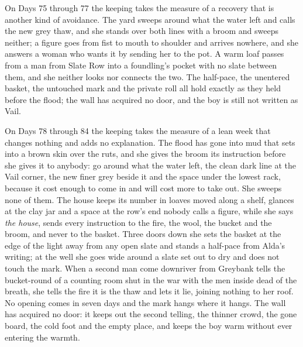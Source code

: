 \documentclass{design/chronicle}
\begin{document}
{On Days 75 through 77 the keeping takes the measure of a recovery that is another kind of avoidance. The yard sweeps around what the water left and calls the new grey thaw, and she stands over both lines with a broom and sweeps neither; a figure goes from fist to mouth to shoulder and arrives nowhere, and she answers a woman who wants it by sending her to the pot. A warm loaf passes from a man from Slate Row into a foundling’s pocket with no slate between them, and she neither looks nor connects the two. The half-pace, the unentered basket, the untouched mark and the private roll all hold exactly as they held before the flood; the wall has acquired no door, and the boy is still not written as Vail.

On Days 78 through 84 the keeping takes the measure of a lean week that changes nothing and adds no explanation. The flood has gone into mud that sets into a brown skin over the ruts, and she gives the broom its instruction before she gives it to anybody: go around what the water left, the clean dark line at the Vail corner, the new finer grey beside it and the space under the lowest rack, because it cost enough to come in and will cost more to take out. She sweeps none of them. The house keeps its number in loaves moved along a shelf, glances at the clay jar and a space at the row’s end nobody calls a figure, while she says \emph{the house}, sends every instruction to the fire, the wool, the bucket and the broom, and never to the basket. Three doors down she sets the basket at the edge of the light away from any open slate and stands a half-pace from Alda’s writing; at the well she goes wide around a slate set out to dry and does not touch the mark. When a second man come downriver from Greybank tells the bucket-round of a counting room shut in the war with the men inside dead of the breath, she tells the fire it is the thaw and lets it lie, joining nothing to her roof. No opening comes in seven days and the mark hangs where it hangs. The wall has acquired no door: it keeps out the second telling, the thinner crowd, the gone board, the cold foot and the empty place, and keeps the boy warm without ever entering the warmth.

}
\end{document}
